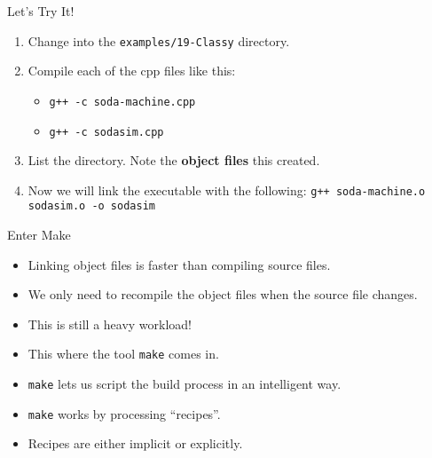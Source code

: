 \documentclass[]{beamer}
\begin{document}
\begin{frame}{Let's Try It!}
\begin{enumerate}[<+->]
    \item Change into the \texttt{examples/19-Classy} directory.
    \item Compile each of the cpp files like this:
    \begin{itemize}
        \item \texttt{g++ -c soda-machine.cpp}
        \item \texttt{g++ -c sodasim.cpp}
    \end{itemize}
    \item List the directory.  Note the \textbf{object files} this
        created.
    \item Now we will link the executable with the following:
        \newline\texttt{g++ soda-machine.o sodasim.o -o sodasim}
\end{enumerate}
\end{frame}

\begin{frame}{Enter Make}
\begin{itemize}[<+->]
    \item Linking object files is faster than compiling source files.
    \item We only need to recompile the object files when the source
        file changes.
    \item This is still a heavy workload!
    \item This where the tool \texttt{make} comes in.
    \item \texttt{make} lets us script the build process in an
        intelligent way.
    \item \texttt{make} works by processing ``recipes''.
    \item Recipes are either implicit or explicitly.
\end{itemize}
\end{frame}
\end{document}
